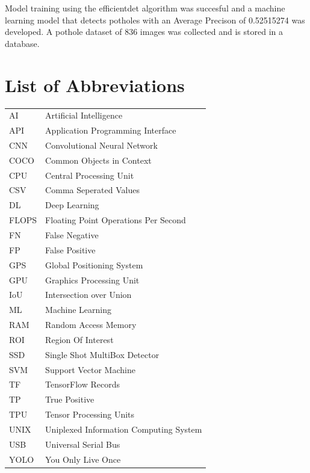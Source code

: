 \documentclass[12pt]{report}
\begin{document}
Model training using the efficientdet algorithm was succesful and a machine learning model that detects potholes with an Average Precison of 0.52515274 was developed. A pothole dataset of 836 images was  collected and is stored in a database.



\newpage

\tableofcontents

\newpage

\listoffigures

\newpage

\listoftables

\newpage



\section*{List of Abbreviations}

\begin{tabular}{p{3cm} l}
	AI & Artificial Intelligence\\
API & Application Programming Interface\\
CNN & Convolutional Neural Network\\ 
COCO & Common Objects in Context\\ 
CPU & Central Processing Unit \\
CSV & Comma Seperated Values \\
DL & Deep Learning\\
FLOPS & Floating Point Operations Per Second \\
FN & False Negative\\
FP & False Positive\\
GPS & Global Positioning System\\
GPU & Graphics Processing Unit \\
IoU & Intersection over Union \\
ML & Machine Learning \\
RAM & Random Access Memory \\
ROI & Region Of Interest \\
SSD & Single Shot MultiBox Detector \\
SVM & Support Vector Machine \\
TF & TensorFlow Records \\
TP & True Positive\\
TPU & Tensor Processing Units \\
UNIX & Uniplexed Information Computing System \\
USB & Universal Serial Bus \\
YOLO & You Only Live Once \\


\end{tabular}
\end{document}
